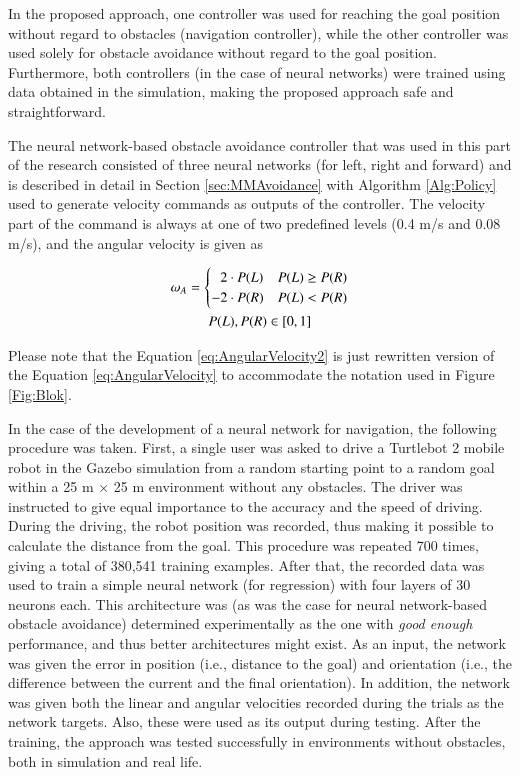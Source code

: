In the proposed approach, one controller was used for reaching the goal position without regard to obstacles (navigation controller), while the other controller was used solely for obstacle avoidance without regard to the goal position. Furthermore, both controllers (in the case of neural networks) were trained using data obtained in the simulation, making the proposed approach safe and straightforward. 

The neural network-based obstacle avoidance controller that was used in this part of the research consisted of three neural networks (for left, right and forward) and is described in detail in Section \ref{sec:MMAvoidance} with Algorithm \ref{Alg:Policy} used to generate velocity commands as outputs of the controller. The velocity part of the command is always at one of two predefined levels (0.4 m/s and 0.08 m/s), and the angular velocity is given as

\begin{gather}
    \label{eq:AngularVelocity2}
    \omega_A = \begin{cases}
        \hphantom{-}2 \cdot P(L) & P(L) \geq P(R)\\
        -2 \cdot  P(R) & P(L) < P(R)
    \end{cases}\\
    P(L), P(R) \in [0,1] \nonumber
\end{gather}

Please note that the Equation \ref{eq:AngularVelocity2} is just rewritten version of the Equation \ref{eq:AngularVelocity} to accommodate the notation used in Figure \ref{Fig:Blok}.

In the case of the development of a neural network for navigation, the following procedure was taken. First, a single user was asked to drive a Turtlebot 2 mobile robot in the Gazebo simulation from a random starting point to a random goal within a 25 m $\times$ 25 m environment without any obstacles. The driver was instructed to give equal importance to the accuracy and the speed of driving. During the driving, the robot position was recorded, thus making it possible to calculate the distance from the goal. This procedure was repeated 700 times, giving a total of 380,541 training examples. After that, the recorded data was used to train a simple neural network (for regression) with four layers of 30 neurons each. This architecture was (as was the case for neural network-based obstacle avoidance) determined experimentally as the one with \emph{good enough} performance, and thus better architectures might exist. As an input, the network was given the error in position (i.e., distance to the goal) and orientation (i.e., the difference between the current and the final orientation). In addition, the network was given both the linear and angular velocities recorded during the trials as the network targets. Also, these were used as its output during testing. After the training, the approach was tested successfully in environments without obstacles, both in simulation and real life. 


